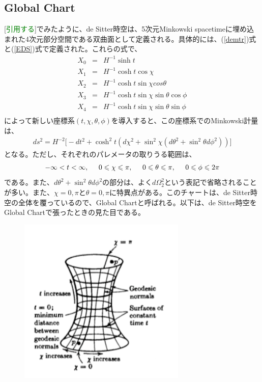 \subsection{Global Chart}
[\textcolor{green}{引用する}]でみたように、de Sitter時空は、5次元Minkowski spacetimeに埋め込まれた4次元部分空間である双曲面として定義される。具体的には、(\ref{demtr})式と(\ref{EDS})式で定義された。これらの式で、
\begin{eqnarray}
  X_0&=&H^{-1}\sinh{t} \\
  X_1&=&H^{-1}\cosh{t}\cos{\chi} \\
  X_2&=&H^{-1}\cosh{t}\sin{\chi}cos{\theta} \\
  X_3&=&H^{-1}\cosh{t}\sin{\chi}\sin{\theta}\cos{\phi} \\
  X_4&=&H^{-1}\cosh{t}\sin{\chi}\sin{\theta}\sin{\phi} \\
\end{eqnarray}
によって新しい座標系$(t,\chi,\theta,\phi)$を導入すると、この座標系でのMinkowski計量は、
\begin{eqnarray}
  ds^2=H^{-2}\biggr[-dt^2+\cosh^2{t}(d\chi^2+\sin^2\chi(d\theta^2+\sin^2\theta d\phi^2))\biggr]
\end{eqnarray}
となる。ただし、それぞれのパレメータの取りうる範囲は、
\begin{eqnarray}
  -\infty< t < \infty,\hspace{0.5cm} 0 \leqslant \chi \leqslant \pi,\hspace{0.5cm} 0 \leqslant \theta \leqslant \pi, \hspace{0.5cm} 0 \leqslant \phi \leqslant 2\pi
\end{eqnarray}である。また、$d\theta^2+\sin^2\theta d\phi^2$の部分は、よく$d\Omega_2^2$という表記で省略されることが多い。また、$\chi=0,\pi$と$\theta=0,\pi$に特異点がある。このチャートは、de Sitter時空の全体を覆っているので、Global Chartと呼ばれる。以下は、de Sitter時空をGlobal Chartで張ったときの見た目である。
\begin{figure}[H]
\begin{center}
  \includegraphics[width=8cm,angle=0]{deSitter.pdf}
  　　　\caption{}
  　　\label{desitter}
\end{center}
\end{figure}

